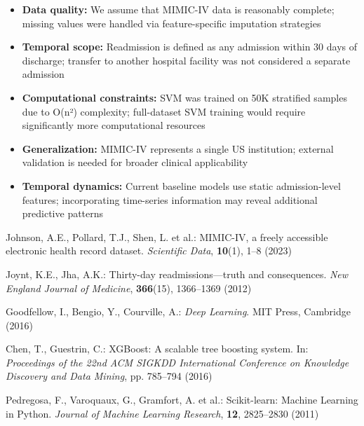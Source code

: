 \documentclass[runningheads]{llncs}
\begin{document}
\begin{itemize}
    \item \textbf{Data quality:} We assume that MIMIC-IV data is reasonably complete; missing values were handled via feature-specific imputation strategies
    \item \textbf{Temporal scope:} Readmission is defined as any admission within 30 days of discharge; transfer to another hospital facility was not considered a separate admission
    \item \textbf{Computational constraints:} SVM was trained on 50K stratified samples due to O(n²) complexity; full-dataset SVM training would require significantly more computational resources
    \item \textbf{Generalization:} MIMIC-IV represents a single US institution; external validation is needed for broader clinical applicability
    \item \textbf{Temporal dynamics:} Current baseline models use static admission-level features; incorporating time-series information may reveal additional predictive patterns
\end{itemize}

\begin{thebibliography}{8}
Johnson, A.E., Pollard, T.J., Shen, L. et al.: MIMIC-IV, a freely accessible electronic health record dataset. \textit{Scientific Data}, \textbf{10}(1), 1--8 (2023)

Joynt, K.E., Jha, A.K.: Thirty-day readmissions—truth and consequences. \textit{New England Journal of Medicine}, \textbf{366}(15), 1366--1369 (2012)

Goodfellow, I., Bengio, Y., Courville, A.: \textit{Deep Learning}. MIT Press, Cambridge (2016)

Chen, T., Guestrin, C.: XGBoost: A scalable tree boosting system. In: \textit{Proceedings of the 22nd ACM SIGKDD International Conference on Knowledge Discovery and Data Mining}, pp. 785--794 (2016)

Pedregosa, F., Varoquaux, G., Gramfort, A. et al.: Scikit-learn: Machine Learning in Python. \textit{Journal of Machine Learning Research}, \textbf{12}, 2825--2830 (2011)

\end{thebibliography}
\end{document}
